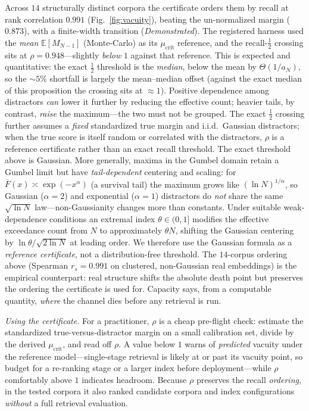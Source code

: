 \documentclass[lettersize,onecolumn]{IEEEtran}
\theoremstyle{definition}
\theoremstyle{remark}
\newcommand{\E}{\mathbb{E}}
\begin{document}
Across $14$ structurally distinct corpora the certificate orders them by recall at
rank correlation $0.991$ (Fig.~\ref{fig:vacuity}), beating the un-normalized margin
($0.873$), with a finite-width transition (\emph{Demonstrated}). The registered harness used the
\emph{mean} $\E[M_{N-1}]$ (Monte-Carlo) as its $\mu_{\mathrm{crit}}$ reference, and
the recall-$\tfrac12$ crossing sits at $\rho=0.948$---slightly \emph{below} $1$
against that reference. This is expected and quantitative: the exact $\tfrac12$
threshold is the \emph{median}, below the mean by $\Theta(1/a_N)$, so the $\sim\!5\%$
shortfall is largely the mean--median offset (against the exact median of this
proposition the crossing sits at $\approx1$). Positive dependence among distractors
\emph{can} lower it further by reducing the effective count; heavier tails, by
contrast, \emph{raise} the maximum---the two must not be grouped. The exact
$\tfrac12$ crossing further assumes a \emph{fixed} standardized true margin and
i.i.d.\ Gaussian distractors; when the true score is itself random or correlated with
the distractors, $\rho$ is a reference certificate rather than an exact recall
threshold. The exact threshold above is Gaussian. More generally, maxima in the Gumbel domain
retain a Gumbel limit but have \emph{tail-dependent} centering and scaling: for
$\overline F(x)\asymp\exp(-x^\alpha)$ (a survival tail) the maximum grows like $(\ln N)^{1/\alpha}$, so Gaussian
($\alpha{=}2$) and exponential ($\alpha{=}1$) distractors do \emph{not} share the same
$\sqrt{\ln N}$ law---non-Gaussianity changes more than constants. Under suitable
weak-dependence conditions an extremal index $\theta\in(0,1]$ modifies the effective
exceedance count from $N$ to approximately $\theta N$, shifting the Gaussian centering
by $\ln\theta/\sqrt{2\ln N}$ at leading order. We therefore use the Gaussian formula as
a \emph{reference certificate}, not a distribution-free threshold. The $14$-corpus
ordering above (Spearman $r_s=0.991$ on clustered,
non-Gaussian real embeddings) is the empirical counterpart: real structure shifts the
absolute death point but preserves the ordering the certificate is used for.
Capacity says, from a computable quantity, \emph{where} the channel dies
before any retrieval is run.

\emph{Using the certificate.} For a practitioner, $\rho$ is a cheap pre-flight check:
estimate the standardized true-versus-distractor margin on a small calibration set,
divide by the derived $\mu_{\mathrm{crit}}$, and read off $\rho$. A value below $1$
warns of \emph{predicted} vacuity under the reference model---single-stage retrieval is
likely at or past its vacuity point, so budget for a re-ranking stage or a larger index
before deployment---while $\rho$ comfortably above $1$ indicates headroom. Because
$\rho$ preserves the recall \emph{ordering}, in the tested corpora it also ranked
candidate corpora and index configurations \emph{without} a full retrieval evaluation.
\end{document}
